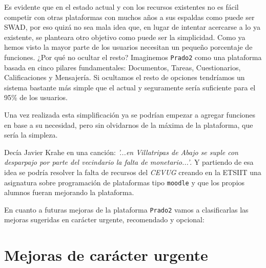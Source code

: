 \bigskip
Es evidente que en el estado actual y con los recursos existentes no es fácil competir con otras plataformas con muchos años a sus espaldas como puede ser SWAD, por eso quizá no sea mala idea que, en lugar de intentar acercarse a lo ya existente, se planteara otro objetivo como puede ser la simplicidad. Como ya hemos visto la mayor parte de los usuarios necesitan un pequeño porcentaje de funciones. ¿Por qué no ocultar el resto? Imaginemos \texttt{Prado2} como una plataforma basada en cinco pilares fundamentales: Documentos, Tareas, Cuestionarios, Calificaciones y Mensajería. Si ocultamos el resto de opciones tendríamos un sistema bastante más simple que el actual y seguramente sería suficiente para el 95\% de los usuarios.

\bigskip
Una vez realizada esta simplificación ya se podrían empezar a agregar funciones en base a su necesidad, pero sin olvidarnos de la máxima de la plataforma, que sería la simpleza.

\bigskip
Decía Javier Krahe en una canción: \textit{'...en Villatripas de Abajo se suple con desparpajo por parte del vecindario la falta de monetario...'}. Y partiendo de esa idea se podría resolver la falta de recursos del \textit{CEVUG} creando en la ETSIIT una asignatura sobre programación de plataformas tipo \texttt{moodle} y que los propios alumnos fueran mejorando la plataforma.

\newpage
En cuanto a futuras mejoras de la plataforma \texttt{Prado2} vamos a clasificarlas las mejoras sugeridas en carácter urgente, recomendado y opcional:

\section{Mejoras de carácter urgente}

